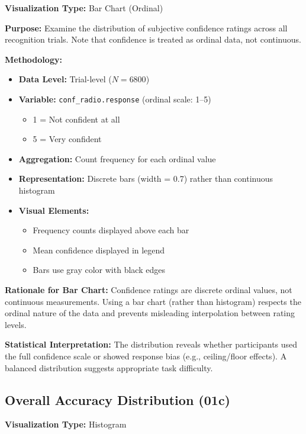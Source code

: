 \documentclass[12pt,a4paper]{article}
\begin{document}
\textbf{Visualization Type:} Bar Chart (Ordinal)

\textbf{Purpose:} Examine the distribution of subjective confidence ratings across all recognition trials. Note that confidence is treated as ordinal data, not continuous.

\textbf{Methodology:}
\begin{itemize}
    \item \textbf{Data Level:} Trial-level ($N=6800$)
    \item \textbf{Variable:} \texttt{conf\_radio.response} (ordinal scale: 1--5)
        \begin{itemize}
            \item 1 = Not confident at all
            \item 5 = Very confident
        \end{itemize}
    \item \textbf{Aggregation:} Count frequency for each ordinal value
    \item \textbf{Representation:} Discrete bars (width = 0.7) rather than continuous histogram
    \item \textbf{Visual Elements:}
        \begin{itemize}
            \item Frequency counts displayed above each bar
            \item Mean confidence displayed in legend
            \item Bars use gray color with black edges
        \end{itemize}
\end{itemize}

\textbf{Rationale for Bar Chart:} Confidence ratings are discrete ordinal values, not continuous measurements. Using a bar chart (rather than histogram) respects the ordinal nature of the data and prevents misleading interpolation between rating levels.

\textbf{Statistical Interpretation:} The distribution reveals whether participants used the full confidence scale or showed response bias (e.g., ceiling/floor effects). A balanced distribution suggests appropriate task difficulty.

\subsection{Overall Accuracy Distribution (01c)}

\textbf{Visualization Type:} Histogram
\end{document}

